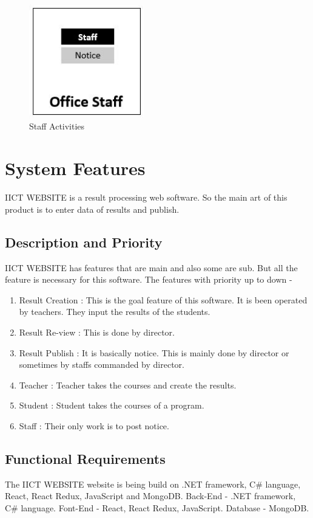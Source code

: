 \documentclass{scrreprt}
\begin{document}
\begin{figure}[h!]
    \centering
    \includegraphics[width=5cm]{assets/6.JPG}
    \caption{Staff Activities}
    \label{fig:Staff Activities}
\end{figure}

\chapter{System Features}
IICT WEBSITE is a result processing web software. So the main art of this product is to enter data of results and publish. 

\section{Description and Priority}
IICT WEBSITE has features that are main and also some are sub. But all the feature is necessary for this software.
\newline
The features with priority up to down - 
\begin{enumerate}
    \item Result Creation : This is the goal feature of this software. It is been operated by teachers. They input the results of the students.
    \item Result Re-view : This is done by director.
    \item Result Publish : It is basically notice. This is mainly done by director or sometimes by staffs commanded by director.
    \item Teacher : Teacher takes the courses and create the results.
    \item Student : Student takes the courses of a program.
    \item Staff : Their only work is to post notice.
\end{enumerate}

\section{Functional Requirements}
The IICT WEBSITE website is being build on .NET framework, C\# language, React, React Redux, JavaScript and MongoDB.
\newline
Back-End - .NET framework, C\# language.
\newline
Font-End - React, React Redux, JavaScript.
\newline
Database -  MongoDB.
\end{document}
